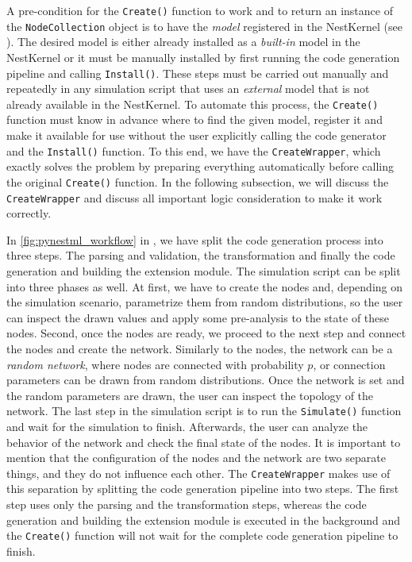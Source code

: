 A pre-condition for the \texttt{Create()} function to work and to return an instance of the \texttt{NodeCollection} object is to have the \emph{model} registered in the NestKernel (see ). The desired model is either already installed as a \emph{built-in} model in the NestKernel or it must be manually installed by first running the code generation pipeline and calling \texttt{Install()}. These steps must be carried out manually and repeatedly in any simulation script that uses an \emph{external} model that is not already available in the NestKernel. To automate this process, the \texttt{Create()} function must know in advance where to find the given model, register it and make it available for use without the user explicitly calling the code generator and the \texttt{Install()} function. To this end, we have the \texttt{CreateWrapper}, which exactly solves the problem by preparing everything automatically before calling the original \texttt{Create()} function. In the following subsection, we will discuss the \texttt{CreateWrapper} and discuss all important logic consideration to make it work correctly.

In \autoref{fig:pynestml_workflow} in , we have split the code generation process into three steps. The parsing and validation, the transformation and finally the code generation and building the extension module. The simulation script can be split into three phases as well. At first, we have to create the nodes and, depending on the simulation scenario, parametrize them from random distributions, so the user can inspect the drawn values and apply some pre-analysis to the state of these nodes. Second, once the nodes are ready, we proceed to the next step and connect the nodes and create the network. Similarly to the nodes, the network can be a \emph{random network}, where nodes are connected with probability $p$, or connection parameters can be drawn from random distributions. Once the network is set and the random parameters are drawn, the user can inspect the topology of the network. The last step in the simulation script is to run the \texttt{Simulate()} function and wait for the simulation to finish. Afterwards, the user can analyze the behavior of the network and check the final state of the nodes. It is important to mention that the configuration of the nodes and the network are two separate things, and they do not influence each other. The \texttt{CreateWrapper} makes use of this separation by splitting the code generation pipeline into two steps. The first step uses only the parsing and the transformation steps, whereas the code generation and building the extension module is executed in the background and the \texttt{Create()} function will not wait for the complete code generation pipeline to finish.

